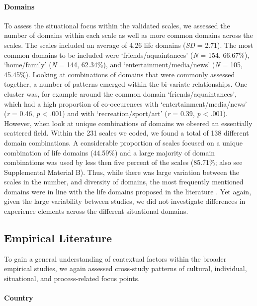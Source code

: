 \paragraph{Domains}

To assess the situational focus within the validated scales, we assessed
the number of domains within each scale as well as more common domains
across the scales. The scales included an average of 4.26 life domains
(\textit{SD} = 2.71). The most common domains to be included were
`friends/aquaintances' (\textit{N} = 154, 66.67\%), `home/family'
(\textit{N} = 144, 62.34\%), and `entertainment/media/news' (\textit{N}
= 105, 45.45\%). Looking at combinations of domains that were commonly
assessed together, a number of patterns emerged within the bi-variate
relationships. One cluster was, for example around the common domain
`friends/aquaintances', which had a high proportion of co-occurences
with `entertainment/media/news' (\textit{r} = 0.46, \textit{p}
\textless{} .001) and with `recreation/sport/art' (\textit{r} = 0.39,
\textit{p} \textless{} .001). However, when look at unique combinations
of domains we obsered an essentially scattered field. Within the 231
scales we coded, we found a total of 138 different domain combinations.
A considerable proportion of scales focused on a unique combination of
life domains (44.59\%) and a large majority of domain combinations was
used by less then five percent of the scales (85.71\%; also see
Supplemental Material B). Thus, while there was large variation between
the scales in the number, and diversity of domains, the most frequently
mentioned domains were in line with the life domains proposed in the
literature \citep[e.g.,][]{Arends-Toth2007}. Yet again, given the large
variability between studies, we did not investigate differences in
experience elements across the different situational domains.

\subsection{Empirical Literature}

To gain a general understanding of contextual factors within the broader
empirical studies, we again assessed cross-study patterns of cultural,
individual, situational, and process-related focus points.

\paragraph{Country}

